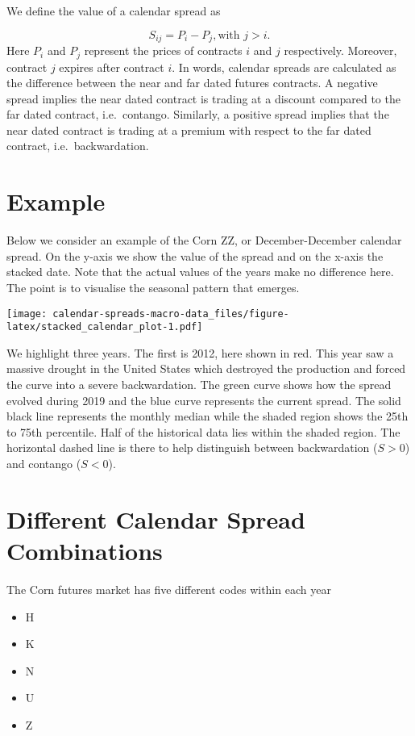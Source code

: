\documentclass[
]{book}
\providecommand{\tightlist}{%
  \setlength{\itemsep}{0pt}\setlength{\parskip}{0pt}}
\begin{document}
We define the value of a calendar spread as

\[
S_{ij} = P_i - P_j, \text{with } j > i.
\]
Here \(P_i\) and \(P_j\) represent the prices of contracts \(i\) and \(j\) respectively. Moreover, contract \(j\) expires after contract \(i\). In words, calendar spreads are calculated as the difference between the near and far dated futures contracts. A negative spread implies the near dated contract is trading at a discount compared to the far dated contract, i.e.~contango. Similarly, a positive spread implies that the near dated contract is trading at a premium with respect to the far dated contract, i.e.~backwardation.

\hypertarget{example}{%
\section{Example}\label{example}}

Below we consider an example of the Corn ZZ, or December-December calendar spread. On the y-axis we show the value of the spread and on the x-axis the stacked date. Note that the actual values of the years make no difference here. The point is to visualise the seasonal pattern that emerges.

\texttt{[image: calendar-spreads-macro-data\_files/figure-latex/stacked\_calendar\_plot-1.pdf]}

We highlight three years. The first is 2012, here shown in red. This year saw a massive drought in the United States which destroyed the production and forced the curve into a severe backwardation. The green curve shows how the spread evolved during 2019 and the blue curve represents the current spread. The solid black line represents the monthly median while the shaded region shows the 25th to 75th percentile. Half of the historical data lies within the shaded region. The horizontal dashed line is there to help distinguish between backwardation (\(S > 0\)) and contango (\(S < 0\)).

\hypertarget{different-calendar-spread-combinations}{%
\section{Different Calendar Spread Combinations}\label{different-calendar-spread-combinations}}

The Corn futures market has five different codes within each year

\begin{itemize}
\tightlist
\item
  H
\item
  K
\item
  N
\item
  U
\item
  Z
\end{itemize}
\end{document}
